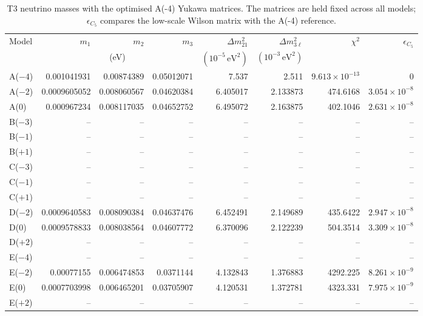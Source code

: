\begin{table}[p]
\centering
\caption{T3 neutrino masses with the optimised A(-4) Yukawa matrices. The matrices are held fixed across all models; $\epsilon_{C_5}$ compares the low-scale Wilson matrix with the A(-4) reference.}
\label{tab:appC_Am4_masses}
\begingroup
\footnotesize
\setlength{\tabcolsep}{3.2pt}
\begin{tabular}{lrrrrrrr}
\hline
Model & $m_1$ & $m_2$ & $m_3$ & $\Delta m^2_{21}$ & $\Delta m^2_{3\ell}$ & $\chi^2$ & $\epsilon_{C_5}$ \\
 & \multicolumn{3}{c}{(eV)} & $(10^{-5}\,\mathrm{eV}^2)$ & $(10^{-3}\,\mathrm{eV}^2)$ &  &  \\
\hline
A($-4$) & 0.001041931 & 0.00874389 & 0.05012071 & 7.537 & 2.511 & $9.613\times10^{-13}$ & 0 \\
A($-2$) & 0.0009605052 & 0.008060567 & 0.04620384 & 6.405017 & 2.133873 & 474.6168 & $3.054\times10^{-8}$ \\
A($0$) & 0.000967234 & 0.008117035 & 0.04652752 & 6.495072 & 2.163875 & 402.1046 & $2.631\times10^{-8}$ \\
B($-3$) & -- & -- & -- & -- & -- & -- & -- \\
B($-1$) & -- & -- & -- & -- & -- & -- & -- \\
B($+1$) & -- & -- & -- & -- & -- & -- & -- \\
C($-3$) & -- & -- & -- & -- & -- & -- & -- \\
C($-1$) & -- & -- & -- & -- & -- & -- & -- \\
C($+1$) & -- & -- & -- & -- & -- & -- & -- \\
D($-2$) & 0.0009640583 & 0.008090384 & 0.04637476 & 6.452491 & 2.149689 & 435.6422 & $2.947\times10^{-8}$ \\
D($0$) & 0.0009578833 & 0.008038564 & 0.04607772 & 6.370096 & 2.122239 & 504.3514 & $3.309\times10^{-8}$ \\
D($+2$) & -- & -- & -- & -- & -- & -- & -- \\
E($-4$) & -- & -- & -- & -- & -- & -- & -- \\
E($-2$) & 0.00077155 & 0.006474853 & 0.0371144 & 4.132843 & 1.376883 & 4292.225 & $8.261\times10^{-9}$ \\
E($0$) & 0.0007703998 & 0.006465201 & 0.03705907 & 4.120531 & 1.372781 & 4323.331 & $7.975\times10^{-9}$ \\
E($+2$) & -- & -- & -- & -- & -- & -- & -- \\
\hline
\end{tabular}
\endgroup
\end{table}
